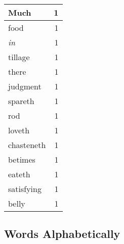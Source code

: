 \begin{center}
\begin{longtable}{l|r}
Much & 1\\ \hline 
food & 1\\ \hline 
\emph{in} & 1\\ \hline 
tillage & 1\\ \hline 
there & 1\\ \hline 
judgment & 1\\ \hline 
spareth & 1\\ \hline 
rod & 1\\ \hline 
loveth & 1\\ \hline 
chasteneth & 1\\ \hline 
betimes & 1\\ \hline 
eateth & 1\\ \hline 
satisfying & 1\\ \hline 
belly & 1\\ \hline 
\end{longtable}  
\end{center}  


  
\normalsize  

  
  


\subsection{Words Alphabetically}

